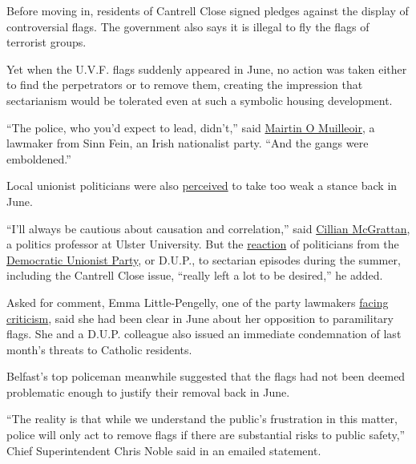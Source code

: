Before moving in, residents of Cantrell Close signed pledges against the
display of controversial flags. The government also says it is illegal
to fly the flags of terrorist groups.

Yet when the U.V.F. flags suddenly appeared in June, no action was taken
either to find the perpetrators or to remove them, creating the
impression that sectarianism would be tolerated even at such a symbolic
housing development.

``The police, who you'd expect to lead, didn't,'' said
\href{https://en.wikipedia.org/wiki/M\%C3\%A1irt\%C3\%ADn_\%C3\%93_Muilleoir}{Mairtin
O Muilleoir}, a lawmaker from Sinn Fein, an Irish nationalist party.
``And the gangs were emboldened.''

Local unionist politicians were also
\href{http://www.belfasttelegraph.co.uk/news/northern-ireland/residents-dont-want-a-fuss-about-uvf-terror-flags-says-dups-pengelly-35846077.html}{perceived}
to take too weak a stance back in June.

``I'll always be cautious about causation and correlation,'' said
\href{https://www.ulster.ac.uk/staff/cp-mcgrattan}{Cillian McGrattan}, a
politics professor at Ulster University. But the
\href{http://www.belfasttelegraph.co.uk/news/northern-ireland/residents-dont-want-a-fuss-about-uvf-terror-flags-says-dups-pengelly-35846077.html}{reaction}
of politicians from the
\href{https://www.nytimes.com/2017/06/10/world/europe/britain-election-dup-northern-ireland.html?_r=0}{Democratic
Unionist Party}, or D.U.P., to sectarian episodes during the summer,
including the Cantrell Close issue, ``really left a lot to be desired,''
he added.

Asked for comment, Emma Little-Pengelly, one of the party lawmakers
\href{http://www.belfasttelegraph.co.uk/news/northern-ireland/dups-pengelly-slammed-over-let-it-be-attitude-to-terrorist-flags-in-mixed-estate-35849293.html}{facing
criticism}, said she had been clear in June about her opposition to
paramilitary flags. She and a D.U.P. colleague also issued an immediate
condemnation of last month's threats to Catholic residents.

Belfast's top policeman meanwhile suggested that the flags had not been
deemed problematic enough to justify their removal back in June.

``The reality is that while we understand the public's frustration in
this matter, police will only act to remove flags if there are
substantial risks to public safety,'' Chief Superintendent Chris Noble
said in an emailed statement.

